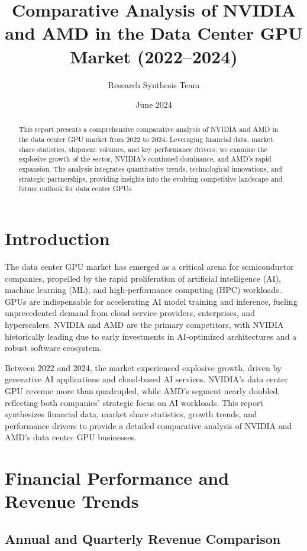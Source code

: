 \documentclass{article}
\title{Comparative Analysis of NVIDIA and AMD in the Data Center GPU Market (2022--2024)}
\author{Research Synthesis Team}
\date{June 2024}
\begin{document}
\maketitle

\begin{abstract}
This report presents a comprehensive comparative analysis of NVIDIA and AMD in the data center GPU market from 2022 to 2024. Leveraging financial data, market share statistics, shipment volumes, and key performance drivers, we examine the explosive growth of the sector, NVIDIA's continued dominance, and AMD's rapid expansion. The analysis integrates quantitative trends, technological innovations, and strategic partnerships, providing insights into the evolving competitive landscape and future outlook for data center GPUs.
\end{abstract}

\section{Introduction}

The data center GPU market has emerged as a critical arena for semiconductor companies, propelled by the rapid proliferation of artificial intelligence (AI), machine learning (ML), and high-performance computing (HPC) workloads. GPUs are indispensable for accelerating AI model training and inference, fueling unprecedented demand from cloud service providers, enterprises, and hyperscalers. NVIDIA and AMD are the primary competitors, with NVIDIA historically leading due to early investments in AI-optimized architectures and a robust software ecosystem.

Between 2022 and 2024, the market experienced explosive growth, driven by generative AI applications and cloud-based AI services. NVIDIA's data center GPU revenue more than quadrupled, while AMD's segment nearly doubled, reflecting both companies' strategic focus on AI workloads. This report synthesizes financial data, market share statistics, growth trends, and performance drivers to provide a detailed comparative analysis of NVIDIA and AMD's data center GPU businesses.

\section{Financial Performance and Revenue Trends}

\subsection{Annual and Quarterly Revenue Comparison}
\end{document}
